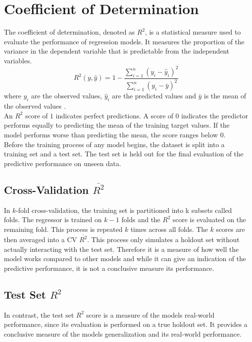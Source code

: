\section{Coefficient of Determination}\label{R2}


The coefficient of determination, denoted as $R^2$, is a statistical measure used to evaluate the performance of regression models. It measures the proportion of the variance in the dependent variable that is predictable from the independent variables. 
\begin{equation}
R^2(y, \hat{y}) = 1 - \frac{\sum_{i=1}^n (y_i - \hat{y}_i)^2}{\sum_{i=1}^n (y_i - \bar{y})^2}
\end{equation}
where $y_i$ are the observed values, $\hat{y}_i$ are the predicted values and $\bar{y}$ is the mean of the observed values \cite{noauthor_34_nodate-1}. \\
An $R^2$ score of $1$ indicates perfect predictions. A score of $0$ indicates the predictor performs equally to predicting the mean of the training target values. If the model performs worse than predicting the mean, the score ranges below $0$. \\
Before the training process of any model begins, the dataset is split into a training set and a test set. The test set is held out for the final evaluation of the predictive performance on unseen data.


\subsection{Cross-Validation $\overline{R^2}$}
In $k$-fold cross-validation, the training set is partitioned into k subsets called folds. The regressor is trained on $k-1$ folds and the $R^2$ score is evaluated on the remaining fold. This process is repeated $k$ times across all folds. The $k$ scores are then averaged into a CV $\overline{R^2}$. This process only simulates a holdout set without actually interacting with the test set. Therefore it is a measure of how well the model works compared to other models and while it can give an indication of the predictive performance, it is not a conclusive measure its performance.

\subsection{Test Set $R^2$}
In contrast, the test set $R^2$ score is a measure of the models real-world performance, since its evaluation is performed on a true holdout set. It provides a conclusive measure of the models generalization and its real-world performance.

